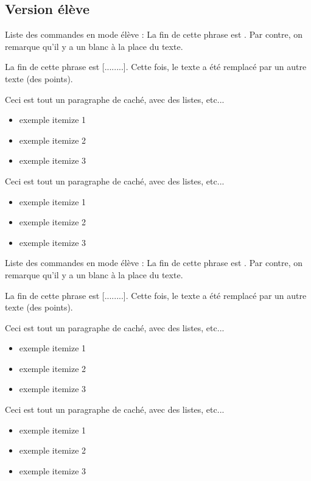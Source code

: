 \documentclass[a4paper,12pt]{article}
\begin{document}
	\subsection{Version élève}
	
	
\begin{code}%
Liste des commandes en mode élève :
La fin de cette phrase est .
Par contre, on remarque qu'il y a un blanc à la place du texte.

La fin de cette phrase est [........].
Cette fois, le texte a été remplacé par un autre texte (des points).

\begin{bigReponse}
	Ceci est tout un paragraphe de caché,
	avec des listes, etc...
	\begin{itemize}
		\item exemple itemize 1
		\item exemple itemize 2
		\item exemple itemize 3
	\end{itemize}
\end{bigReponse}
\begin{bigReponse}
	Ceci est tout un paragraphe de caché,
	avec des listes, etc...
	\begin{itemize}
		\item exemple itemize 1
		\item exemple itemize 2
		\item exemple itemize 3
	\end{itemize}
\end{bigReponse}
\end{code}

Liste des commandes en mode élève :
La fin de cette phrase est . Par contre, on remarque qu'il y a un blanc à la place du texte.

La fin de cette phrase est [........]. Cette fois, le texte a été remplacé par un autre texte (des points).

\begin{bigReponse}
	Ceci est tout un paragraphe de caché,
	avec des listes, etc...
	\begin{itemize}
		\item exemple itemize 1
		\item exemple itemize 2
		\item exemple itemize 3
	\end{itemize}
\end{bigReponse}
\begin{bigReponse}
	Ceci est tout un paragraphe de caché,
	avec des listes, etc...
	\begin{itemize}
		\item exemple itemize 1
		\item exemple itemize 2
		\item exemple itemize 3
	\end{itemize}
\end{bigReponse}
\end{document}
